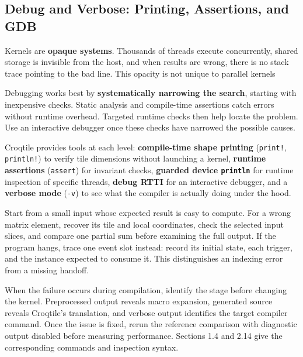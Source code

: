 \subsection*{Debug and Verbose: Printing, Assertions, and GDB}

Kernels are \textbf{opaque systems}. Thousands of threads execute concurrently, shared storage is invisible from the host, and when results are wrong, there is no stack trace pointing to the bad line. This opacity is not unique to parallel kernels

Debugging works best by \textbf{systematically narrowing the search}, starting with inexpensive checks. Static analysis and compile-time assertions catch errors without runtime overhead. Targeted runtime checks then help locate the problem. Use an interactive debugger once these checks have narrowed the possible causes.

Croqtile provides tools at each level: \textbf{compile-time shape printing} (\texttt{print!}, \texttt{println!}) to verify tile dimensions without launching a kernel, \textbf{runtime assertions} (\texttt{assert}) for invariant checks, \textbf{guarded device \texttt{println}} for runtime inspection of specific threads, \textbf{debug RTTI} for an interactive debugger, and a \textbf{verbose mode} (\texttt{-v}) to see what the compiler is actually doing under the hood.

Start from a small input whose expected result is easy to compute. For a wrong matrix element, recover its tile and local coordinates, check the selected input slices, and compare one partial sum before examining the full output. If the program hangs, trace one event slot instead: record its initial state, each trigger, and the instance expected to consume it. This distinguishes an indexing error from a missing handoff.

When the failure occurs during compilation, identify the stage before changing the kernel. Preprocessed output reveals macro expansion, generated source reveals Croqtile's translation, and verbose output identifies the target compiler command. Once the issue is fixed, rerun the reference comparison with diagnostic output disabled before measuring performance. Sections 1.4 and 2.14 give the corresponding commands and inspection syntax.

